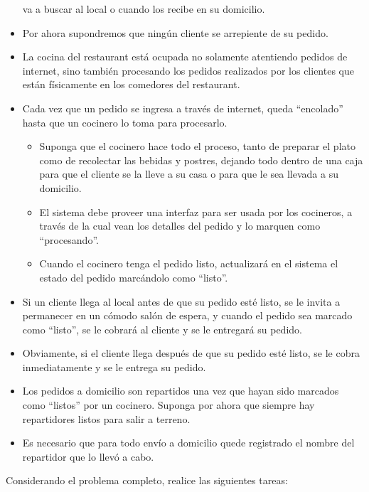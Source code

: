 \documentclass[11pt,letterpaper]{article}
\begin{document}
\begin{spacing}{1.2}
\begin{Problem}
\begin{itemize}
    va a buscar al local o cuando los recibe en su domicilio.
        \item Por ahora supondremos que ningún cliente se arrepiente de su pedido.
        \item La cocina del restaurant está ocupada no solamente atentiendo pedidos
            de internet, sino también procesando los pedidos realizados por los clientes
            que están físicamente en los comedores del restaurant.
        \item Cada vez que un pedido se ingresa a través de internet, queda ``encolado''
            hasta que un cocinero lo toma para procesarlo.
        \begin{itemize}
            \item Suponga que el cocinero hace todo el proceso, tanto de preparar el plato
                como de recolectar las bebidas y postres, dejando todo dentro de una caja para que
                el cliente se la lleve a su casa o para que le sea llevada a su domicilio.
            \item  El sistema debe proveer una interfaz para ser usada por los cocineros, a través de la cual
                vean los detalles del pedido y lo marquen como ``procesando''.
            \item Cuando el cocinero tenga el
            pedido listo, actualizará en el sistema el estado del pedido marcándolo como ``listo''.
        \end{itemize}
        \item Si un cliente llega al local antes de que su pedido esté listo, se le invita a
            permanecer en un cómodo salón de espera, y cuando el pedido sea marcado como ``listo'',
            se le cobrará al cliente y se le entregará su pedido.
        \item Obviamente, si el cliente llega después de que su pedido esté listo, se le cobra
            inmediatamente y se le entrega su pedido.
        \item Los pedidos a domicilio son repartidos una vez que hayan sido marcados
            como ``listos'' por un cocinero. Suponga por ahora que siempre hay repartidores
            listos para salir a terreno.
        \item Es necesario que para todo envío a domicilio quede registrado el nombre del repartidor que
            lo llevó a cabo.
    \end{itemize}

    \vspace{1em}
    Considerando el problema completo, realice las siguientes tareas:


\end{Problem}
\end{spacing}
\end{document}
